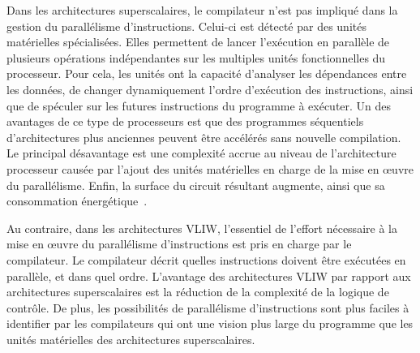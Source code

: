Dans les architectures superscalaires, le compilateur n'est pas impliqué dans la gestion du parallélisme d'instructions. Celui-ci est détecté par des unités matérielles spécialisées. 
Elles permettent de lancer l'exécution en parallèle de plusieurs opérations indépendantes sur les multiples unités fonctionnelles du processeur.
Pour cela, les unités ont la capacité d'analyser les dépendances entre les données, de changer dynamiquement l'ordre d'exécution des instructions, ainsi que de spéculer sur les futures instructions du programme à exécuter.
Un des avantages de ce type de processeurs est que des programmes séquentiels d'architectures plus anciennes peuvent être accélérés sans nouvelle compilation. Le principal désavantage est une  complexité accrue au niveau de l'architecture processeur causée par l'ajout des unités matérielles en charge de la mise en œuvre du parallélisme. Enfin, la surface du circuit résultant augmente, ainsi que sa consommation énergétique~\cite{rau1993instruction}.

Au contraire, dans les architectures VLIW, l'essentiel de l'effort nécessaire à la mise en œuvre du parallélisme d'instructions est pris en charge par le compilateur. Le compilateur décrit quelles instructions doivent être exécutées en parallèle, et dans quel ordre. L'avantage des architectures VLIW par rapport aux architectures superscalaires est la réduction de la complexité de la logique de contrôle. De plus, les possibilités de parallélisme d'instructions sont plus faciles à identifier par les compilateurs qui ont une vision plus large du programme que les unités matérielles des architectures superscalaires.


